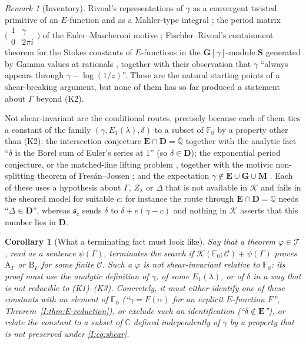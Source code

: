 \documentclass[11pt,a4paper]{article}
\newcommand{\C}{\mathbb C}
\newcommand{\Qbar}{\overline{\mathbb Q}}
\newcommand{\EE}{\mathbf E}
\newcommand{\GG}{\mathbf G}
\newcommand{\DD}{\mathbf D}
\newcommand{\Sring}{\mathbf S}
\newcommand{\Fld}{\mathbb F}
\newcommand{\Th}{\mathcal K}
\newcommand{\Tth}{\mathcal T}
\newcommand{\shear}{\mathfrak s}
\newtheorem{corollary}[theorem]{Corollary}
\theoremstyle{definition}
\theoremstyle{remark}
\newtheorem{remark}[theorem]{Remark}
\numberwithin{equation}{section}
\begin{document}
\begin{remark}[Inventory]
Rivoal's representations of $\gamma$ as a convergent twisted primitive of an $E$-function
and as a Mahler-type integral \cite{Rivoal2017}; the period matrix
$\bigl(\begin{smallmatrix}1&\gamma\\0&2\pi i\end{smallmatrix}\bigr)$ of the
Euler--Mascheroni motive \cite{FJ}; Fischler--Rivoal's containment theorem for the Stokes
constants of $E$-functions in the $\GG[\gamma]$-module $\Sring$ generated by Gamma values
at rationals \cite[Thm.~2]{FR2016}, together with their observation that $\gamma$
``always appears through $\gamma-\log(1/z)$''. These are the natural starting points of a
shear-breaking argument, but none of them has so far produced a statement about
$\Gamma$ beyond (K2).

Not shear-invariant are the conditional routes, precisely because each of them ties a
constant of the family $(\gamma,E_1(\lambda),\delta)$ to a subset of $\Fld_0$ by a
property other than (K2): the intersection conjecture $\EE\cap\DD=\Qbar$ \cite{FRmixed}
together with the analytic fact ``$\delta$ is the Borel sum of Euler's series at $1$''
(so $\delta\in\DD$); the exponential period conjecture, or the matched-line lifting
problem \cite[\S``The Euler--Tate matched-line target'']{K002}, together with the
motivic non-splitting theorem of Fres\'an--Jossen \cite{FJ}; and the expectation
$\gamma\notin\EE\cup\GG\cup\mathbf M$ \cite{Rivoal2017}. Each of these uses a
hypothesis about $\Gamma$, $Z_\lambda$ or $\Delta$ that is not available in $\Th$ and
fails in the sheared model for suitable $c$: for instance the route through
$\EE\cap\DD=\Qbar$ needs ``$\Delta\in\DD$'', whereas $\shear_c$ sends $\delta$ to
$\delta+e(\gamma-c)$ and nothing in $\Th$ asserts that this number lies in $\DD$.
\end{remark}

\begin{corollary}[What a terminating fact must look like]\label{I:cor:terminating}
Say that a theorem $\varphi\in\Tth$, read as a sentence $\psi(\Gamma)$, \emph{terminates
the search} if $\Th(\Fld_0;\mathcal C)+\psi(\Gamma)$ proves $\mathrm A_\Gamma$ or
$\mathrm B_\Gamma$ for some finite $\mathcal C$. Such a $\varphi$ is not shear-invariant
relative to $\Fld_0$: its proof must use the analytic definition of $\gamma$, of some
$E_1(\lambda)$, or of $\delta$ in a way that is not reducible to (K1)--(K3). Concretely,
it must either identify one of these constants with an element of $\Fld_0$
(``$\gamma=F(\alpha)$ for an explicit $E$-function $F$'', Theorem~\ref{I:thm:E-reduction}),
or exclude such an identification (``$\delta\notin\EE$''), or relate the constant to a
subset of $\C$ defined independently of $\gamma$ by a property that is not preserved
under \eqref{I:eq:shear}.
\end{corollary}
\end{document}
